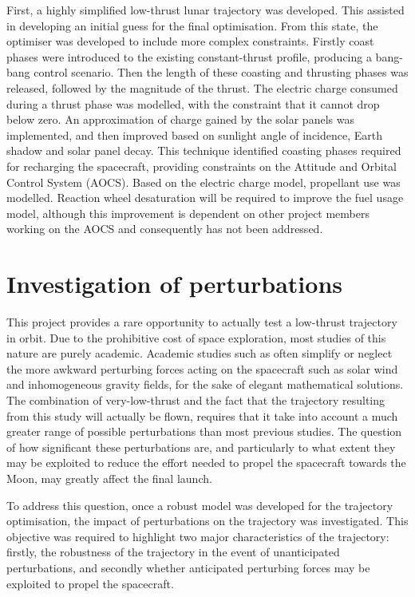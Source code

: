 First, a highly simplified low-thrust lunar trajectory was developed. This assisted in developing an initial guess for the final optimisation. From this state, the optimiser was developed to include more complex constraints. Firstly coast phases were introduced to the existing constant-thrust profile, producing a bang-bang control scenario. Then the length of these coasting and thrusting phases was released, followed by the magnitude of the thrust. The electric charge consumed during a thrust phase was modelled, with the constraint that it cannot drop below zero. An approximation of charge gained by the solar panels was implemented, and then improved based on sunlight angle of incidence, Earth shadow and solar panel decay. This technique identified coasting phases required for recharging the spacecraft, providing constraints on the Attitude and Orbital Control System (AOCS). Based on the electric charge model, propellant use was modelled. Reaction wheel desaturation will be required to improve the fuel usage model, although this improvement is dependent on other project members working on the AOCS and consequently has not been addressed.

\section{Investigation of perturbations} \label{sec:Perturbation-objective}

This project provides a rare opportunity to actually test a low-thrust trajectory in orbit. Due to the prohibitive cost of space exploration, most studies of this nature are purely academic. Academic studies such as \textcite{Betts2000} often simplify or neglect the more awkward perturbing forces acting on the spacecraft such as solar wind and inhomogeneous gravity fields, for the sake of elegant mathematical solutions. The combination of very-low-thrust and the fact that the trajectory resulting from this study will actually be flown, requires that it take into account a much greater range of possible perturbations than most previous studies. The question of how significant these perturbations are, and particularly to what extent they may be exploited to reduce the effort needed to propel the spacecraft towards the Moon, may greatly affect the final launch.

To address this question, once a robust model was developed for the trajectory optimisation, the impact of perturbations on the trajectory was investigated. This objective was required to highlight two major characteristics of the trajectory: firstly, the robustness of the trajectory in the event of unanticipated perturbations, and secondly whether anticipated perturbing forces may be exploited to propel the spacecraft.

